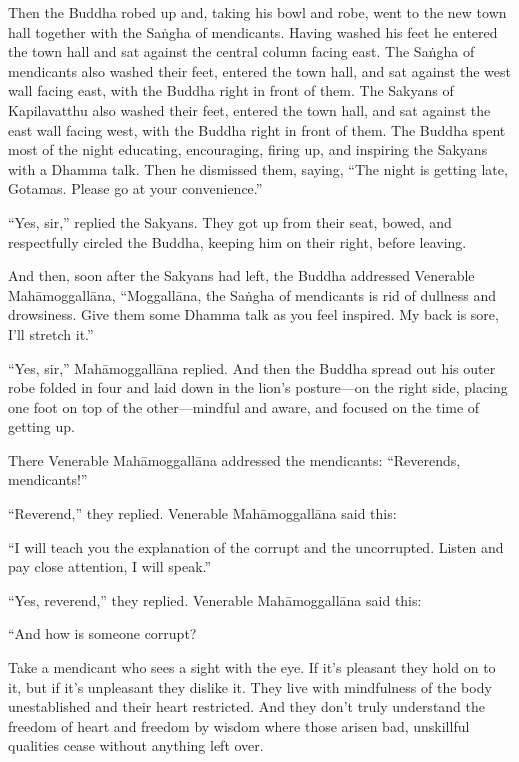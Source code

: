 \documentclass[12pt,openany]{book}%
\begin{document}
Then the Buddha robed up and, taking his bowl and robe, went to the new town hall together with the \textsanskrit{Saṅgha} of mendicants. Having washed his feet he entered the town hall and sat against the central column facing east. The \textsanskrit{Saṅgha} of mendicants also washed their feet, entered the town hall, and sat against the west wall facing east, with the Buddha right in front of them. The Sakyans of Kapilavatthu also washed their feet, entered the town hall, and sat against the east wall facing west, with the Buddha right in front of them. The Buddha spent most of the night educating, encouraging, firing up, and inspiring the Sakyans with a Dhamma talk. Then he dismissed them, saying, “The night is getting late, Gotamas. Please go at your convenience.” 

“Yes, sir,” replied the Sakyans. They got up from their seat, bowed, and respectfully circled the Buddha, keeping him on their right, before leaving. 

And then, soon after the Sakyans had left, the Buddha addressed Venerable \textsanskrit{Mahāmoggallāna}, “\textsanskrit{Moggallāna}, the \textsanskrit{Saṅgha} of mendicants is rid of dullness and drowsiness. Give them some Dhamma talk as you feel inspired. My back is sore, I’ll stretch it.” 

“Yes, sir,” \textsanskrit{Mahāmoggallāna} replied. And then the Buddha spread out his outer robe folded in four and laid down in the lion’s posture—on the right side, placing one foot on top of the other—mindful and aware, and focused on the time of getting up. 

There Venerable \textsanskrit{Mahāmoggallāna} addressed the mendicants: “Reverends, mendicants!” 

“Reverend,” they replied. Venerable \textsanskrit{Mahāmoggallāna} said this: 

“I will teach you the explanation of the corrupt and the uncorrupted. Listen and pay close attention, I will speak.” 

“Yes, reverend,” they replied. Venerable \textsanskrit{Mahāmoggallāna} said this: 

“And how is someone corrupt? 

Take a mendicant who sees a sight with the eye. If it’s pleasant they hold on to it, but if it’s unpleasant they dislike it. They live with mindfulness of the body unestablished and their heart restricted. And they don’t truly understand the freedom of heart and freedom by wisdom where those arisen bad, unskillful qualities cease without anything left over. 
\end{document}
